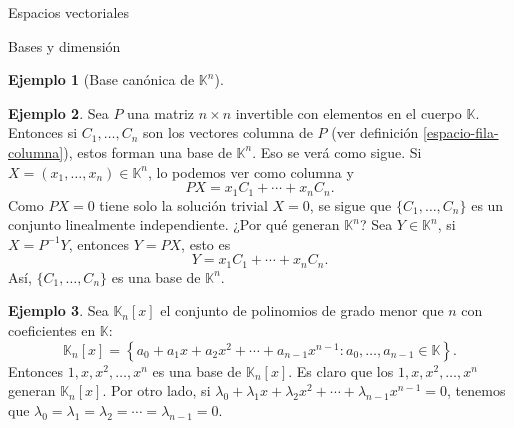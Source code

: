 \documentclass[a4paper,12pt,twoside,spanish,reqno]{amsbook}
\theoremstyle{definition}
\newtheorem{ejemplo}{Ejemplo}[section]
\theoremstyle{remark}
\newcommand{\K}{\mathbb K}
\begin{document}
\begin{chapter}{Espacios vectoriales}
\begin{section}{Bases y dimensión}
\begin{ejemplo}[{\sc Base canónica de $\K^n$}]
\begin{enumerate}
        
    \end{enumerate}
\end{ejemplo}
 
 
 \begin{ejemplo}
     Sea $P$ una matriz $n \times n$ invertible con elementos en el cuerpo $\K$. Entonces si $C_1,\ldots,C_n$ son los vectores columna de $P$ (ver definición  \ref{espacio-fila-columna}), estos forman una base de $\K^n$. Eso se verá como sigue. Si $X = (x_1,\ldots,x_n) \in \K^n$, lo podemos ver como columna y 
     $$
     PX=x_1C_1+\cdots+x_nC_n.
     $$
     Como $PX=0$ tiene solo la solución trivial $X= 0$, se sigue que $\{C_1,\ldots,C_n\}$ es un conjunto linealmente independiente. ¿Por qué generan $\K^n$? Sea $Y \in \K^n$, si $X = P^{-1} Y$, entonces $Y = PX$, esto es
     $$
     Y=x_1C_1+\cdots+x_nC_n.
     $$
     Así, $\{C_1,\ldots,C_n\}$ es una base de $\K^n$.
 \end{ejemplo}


\begin{ejemplo}
    Sea $\K_n[x]$  el conjunto de polinomios de grado menor  que $n$ con coeficientes en $\K$:
    $$
    \K_n[x] = \left\{a_0 + a_1 x + a_2x^2+\cdots+a_{n-1}x^{n-1}: a_0,\ldots,a_{n-1} \in \K  \right\}.
    $$
    Entonces $1,x,x^2,\ldots,x^n$  es una base de $\K_n[x]$. Es claro que los $1,x,x^2,\ldots,x^n$ generan $\K_n[x]$. Por otro lado, si  $\lambda_0 + \lambda_1 x + \lambda_2x^2+\cdots+\lambda_{n-1}x^{n-1} =0$, tenemos que $\lambda_0=\lambda_1 = \lambda_2 =\cdots =\lambda_{n-1} =0$.
\end{ejemplo}


\end{section}
\end{chapter}
\end{document}
